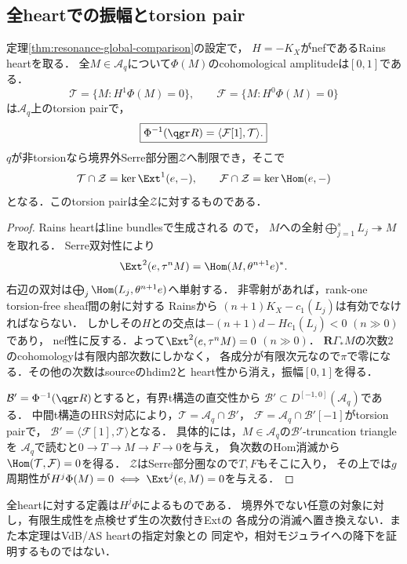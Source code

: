 \subsection{全heartでの振幅とtorsion pair}
\begin{theorem}
\label{thm:resonance-global-tilt}
定理\ref{thm:resonance-global-comparison}の設定で，
$H=-K_X$がnefであるRains heartを取る．
全$M\in\mathcal A_q$について$\Phi(M)$のcohomological amplitudeは$[0,1]$である．
\[
\mathcal T=\{M:H^1\Phi(M)=0\},\qquad
\mathcal F=\{M:H^0\Phi(M)=0\}
\]
は$\mathcal A_q$上のtorsion pairで，
\[
\boxed{\Phi^{-1}(\qgr R)=\langle\mathcal F[1],\mathcal T\rangle.}
\]
$q$が非torsionなら境界外Serre部分圏$\mathcal Z$へ制限でき，そこで
\[
\mathcal T\cap\mathcal Z=\ker\Ext^1(e,-),\qquad
\mathcal F\cap\mathcal Z=\ker\Hom(e,-)
\]
となる．このtorsion pairは全$\mathcal Z$に対するものである．
\end{theorem}
\begin{proof}
Rains heartはline bundlesで生成される
\cite[Theorem 9.10]{RainsBirational}ので，
$M$への全射$\bigoplus_{j=1}^sL_j\twoheadrightarrow M$を取れる．
Serre双対性により
\[
\Ext^2(e,\tau^nM)=\Hom(M,\theta^{n+1}e)^*.
\]
右辺の双対は$\bigoplus_j\Hom(L_j,\theta^{n+1}e)$へ単射する．
非零射があれば，rank-one torsion-free sheaf間の射に対する
Rains\cite[Corollary 10.12]{RainsBirational}から
$(n+1)K_X-c_1(L_j)$は有効でなければならない．
しかしその$H$との交点は$-(n+1)d-Hc_1(L_j)<0$ $(n\gg0)$であり，
nef性に反する．よって$\Ext^2(e,\tau^nM)=0$ $(n\gg0)$．
$\mathbf R\Gamma_*M$の次数2のcohomologyは有限内部次数にしかなく，
各成分が有限次元なので$\pi$で零になる．その他の次数はsourceのhdim2と
heart性から消え，振幅$[0,1]$を得る．

$\mathcal B'=\Phi^{-1}(\qgr R)$とすると，有界t構造の直交性から
$\mathcal B'\subset D^{[-1,0]}(\mathcal A_q)$である．
中間t構造のHRS対応により，$\mathcal T=\mathcal A_q\cap\mathcal B'$，
$\mathcal F=\mathcal A_q\cap\mathcal B'[-1]$がtorsion pairで，
$\mathcal B'=\langle\mathcal F[1],\mathcal T\rangle$となる．
具体的には，$M\in\mathcal A_q$の$\mathcal B'$-truncation triangleを
$\mathcal A_q$で読むと$0\to T\to M\to F\to0$を与え，
負次数のHom消滅から$\Hom(\mathcal T,\mathcal F)=0$を得る．
$\mathcal Z$はSerre部分圏なので$T,F$もそこに入り，
その上では$g$周期性が$H^j\Phi(M)=0\iff\Ext^j(e,M)=0$を与える．
\end{proof}
\begin{remark}
全heartに対する定義は$H^j\Phi$によるものである．
境界外でない任意の対象に対し，有限生成性を点検せず生の次数付きExtの
各成分の消滅へ置き換えない．また本定理はVdB/AS heartの指定対象との
同定や，相対モジュライへの降下を証明するものではない．
\end{remark}

